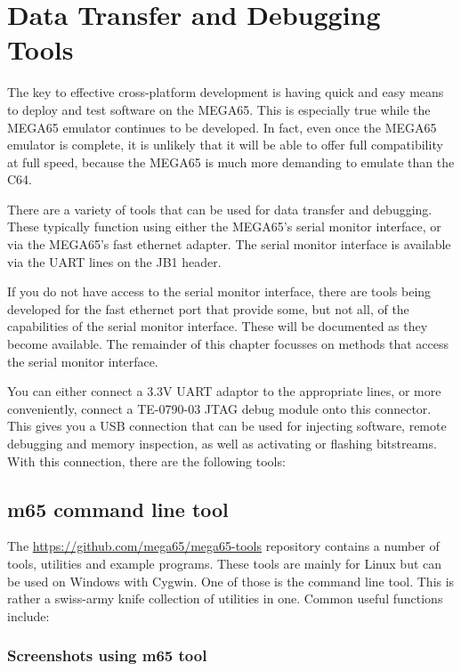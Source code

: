 \chapter{Data Transfer and Debugging Tools}
\label{cha:transfer-and-debug-tools}

The key to effective cross-platform development is having quick and
easy means to deploy and test software on the MEGA65.  This is
especially true while the MEGA65 emulator continues to be developed.
In fact, even once the MEGA65 emulator is complete, it is unlikely
that it will be able to offer full compatibility at full speed,
because the MEGA65 is much more demanding to emulate than the C64.

There are a variety of tools that can be used for data transfer and
debugging.  These typically function using either the MEGA65's serial
monitor interface, or via the MEGA65's fast ethernet adapter.  The
serial monitor interface is available via the UART lines on the JB1
header.

If you do not have access to the serial monitor interface, there are
tools being developed for the fast ethernet port that provide some,
but not all, of the capabilities of the serial monitor
interface. These will be documented as they become available. The
remainder of this chapter focusses on methods that access the serial
monitor interface.

You can either connect a 3.3V UART adaptor to the appropriate
lines, or more conveniently, connect a TE-0790-03 JTAG debug module
onto this connector.  This gives you a USB connection that can be used
for injecting software, remote debugging and memory inspection, as
well as activating or flashing bitstreams.  With this connection,
there are the following tools:

\section{m65 command line tool}

The \url{https://github.com/mega65/mega65-tools} repository contains a
number of tools, utilities and example programs. These tools are mainly for Linux but can be used on Windows with Cygwin. One of those is
the  command line tool. This is rather a swiss-army
knife collection of utilities in one.  Common useful functions
include:

\subsection{Screenshots using m65 tool}

